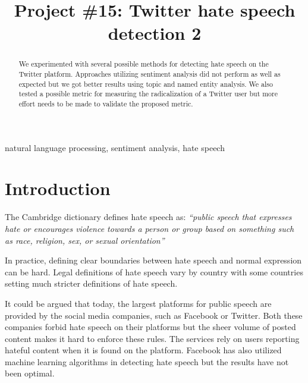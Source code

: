\documentclass[conference]{IEEEtran}
\begin{document}
\title{Project \#15: Twitter hate speech detection 2\\
}

\author{

\and
{}

\and
{}

\and
{}

}

\maketitle

\begin{abstract}
We experimented with several possible methods for detecting hate speech on the Twitter 
platform. Approaches utilizing sentiment analysis did not perform as well as expected but 
we got better results using topic and named entity analysis. We also tested a possible metric 
for measuring the radicalization of a Twitter user but more effort needs to be made to 
validate the proposed metric.
\end{abstract}

\begin{IEEEkeywords}
natural language processing, sentiment analysis, hate speech
\end{IEEEkeywords}
\section{Introduction}
The Cambridge dictionary defines hate speech as:
\vspace{12pt}
\emph{``public speech that expresses hate or encourages violence towards a person or group based on something
such as race, religion, sex, or sexual orientation''} \cite{Cambridge:hate_speech}
\vspace{12pt}

In practice, defining clear boundaries between hate speech and normal expression can be
hard. Legal definitions of hate speech vary by country with some countries setting much
stricter definitions of hate speech. \cite{Wikipedia:hate_speech_laws}

It could be argued that today, the largest platforms for public speech are provided by 
the social media companies, such as Facebook or Twitter. Both these companies forbid 
hate speech on their platforms \cite{Twitter:hate_speech,Facebook:hate_speech} but the sheer volume 
of posted content makes it hard to enforce these rules. The services rely on users reporting
hateful content when it is found on the platform. Facebook has also utilized machine learning
algorithms in detecting hate speech but the results have not been optimal. \cite{Time:facebook_hate_speech_languages}
\end{document}

